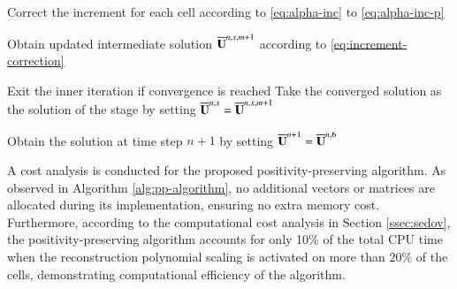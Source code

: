 \begin{algorithm}[htbp!]
\begin{algorithmic}[1]
        \State Correct the increment for each cell according to \eqref{eq:alpha-inc} to \eqref{eq:alpha-inc-p}

        \State Obtain updated intermediate solution $\overline{\mathbf{U}}^{n,s,m+1}$ according to \eqref{eq:increment-correction} %

        \State Exit the inner iteration if convergence is reached
		\EndFor
        \State Take the converged solution as the solution of the stage by setting $\overline{\mathbf{U}}^{n,s}=\overline{\mathbf{U}}^{n,s,m+1}$ %
		\EndFor
 	
        \State Obtain the solution at time step $n+1$ by setting $\overline{\mathbf{U}}^{n+1} =\overline{\mathbf{U}}^{n,6}$ %

 	\EndFunction 
 		
 		
 		
 		
 		
 		
 		
 	\end{algorithmic}  
 \end{algorithm}  

A cost analysis is conducted for the proposed positivity-preserving algorithm. As observed in Algorithm \ref{alg:pp-algorithm}, no additional vectors or matrices are allocated during its implementation, ensuring no extra memory cost. Furthermore, according to the computational cost analysis in Section \ref{ssec:sedov}, the positivity-preserving algorithm accounts for only 10\% of the total CPU time when the reconstruction polynomial scaling is activated on more than $20\%$ of the cells, demonstrating computational efficiency of the algorithm.

